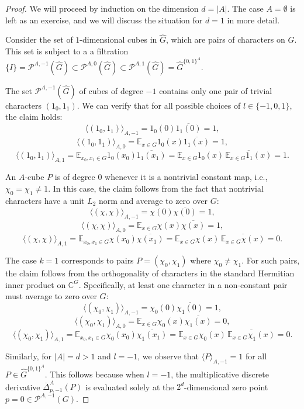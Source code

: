 \documentclass{amsart}
\theoremstyle{definition}
\theoremstyle{remark}
\numberwithin{equation}{section}
\begin{document}
\begin{proof}
We will proceed by induction on the dimension  $d = |A|$. The case $A=\emptyset$ is left as an exercise, and we will discuss  the situation for 
 $d=1$ in more detail.  
 
Consider  the set of $1$-dimensional cubes in $\widehat{G}$, which are pairs of characters on $G$. This set is subject to a a filtration $\{I\}=\mathcal{P}^{A,-1}(\widehat{G}) \subset \mathcal{P}^{A,0}(\widehat{G}) \subset \mathcal{P}^{A,1}(\widehat{G}) = \widehat{G}^{\{0,1\}^{A}}$.

The set $\mathcal{P}^{A,-1}(\widehat{G})$ of cubes of degree $-1$ contains only one pair of trivial characters $(1_0,1_1)$. We can verify that for all possible choices of $l \in \{-1,0,1\}$, the claim holds:
$$ \langle \left(1_0,1_1\right) \rangle_{A,-1} = 1_0(0)\overline{1_1(0)} = 1,$$
$$ \langle \left(1_0,1_1\right) \rangle_{A,0} = \mathbb{E}_{x \in G}1_0(x)\overline{1_1(x)} = 1,$$
$$ \langle \left(1_0,1_1\right) \rangle_{A,1} = \mathbb{E}_{x_0,x_1 \in G}1_0(x_0)\overline{1_1(x_1)} = \mathbb{E}_{x \in G}1_0(x) \, \overline{\mathbb{E}_{x \in G}1_1(x)}= 1.$$

An $A$-cube $P$ is of degree 0  whenever it is a nontrivial constant map, i.e., $\chi_0 = \chi_1 \neq 1$. 
In this case, the claim follows from the fact that nontrivial characters have a unit $L_2$ norm and average to zero over $G$:
$$ \langle \left(\chi,\chi\right) \rangle_{A,-1} = \chi(0)\overline{\chi(0)} = 1,$$
$$ \langle \left(\chi, \chi\right) \rangle_{A,0} = \mathbb{E}_{x \in G}\chi(x)\overline{\chi(x)} = 1,$$
$$ \langle \left(\chi,\chi\right) \rangle_{A,1} = \mathbb{E}_{x_0,x_1 \in G}\chi(x_0)\overline{\chi(x_1)} = \mathbb{E}_{x \in G}\chi(x) \, \overline{\mathbb{E}_{x \in G}\chi(x)}= 0.$$

The case $k=1$ corresponds to pairs $P=(\chi_0, \chi_1)$ where $\chi_0 \neq \chi_1$. For such pairs, the claim follows from the orthogonality of characters in the standard Hermitian inner product on $\mathbb{C}^G$. Specifically, at least one character in a non-constant pair must average to zero over $G$:
$$\langle (\chi_0,\chi_1)\rangle_{A,-1} =  \chi_0(0)\overline{\chi_1(0) }= 1, $$
$$\langle (\chi_0,\chi_1)\rangle_{A,0} = \mathbb{E}_{x\in G} \chi_0(x)\overline{\chi_1(x) }= 0, $$
$$ \langle \left(\chi_0,\chi_1\right) \rangle_{A,1} = \mathbb{E}_{x_0,x_1 \in G}\chi_0(x_0)\overline{\chi_1(x_1)} = \mathbb{E}_{x \in G}\chi_0(x) \, \overline{\mathbb{E}_{x \in G}\chi_1(x)}= 0.$$

Similarly, for  $|A|=d>1$ and $l=-1$,  we  observe that $\langle P \rangle_{A,-1} =1$ for all $P \in \widehat{G}^{\{0,1\}^{A}}$. This follows because when $l = -1$, the multiplicative discrete derivative $\overline{\Delta}^A_{p,-1}(P)$ is evaluated solely at the $2^d$-dimensional zero point $p =0 \in \mathcal{P}^{A,-1}( G)$. 


\end{proof}
\end{document}
